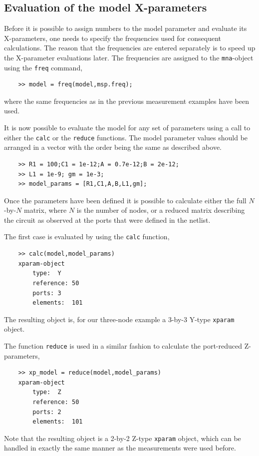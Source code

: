 \subsection{Evaluation of the model X-parameters}
Before it is possible to assign numbers to the model parameter and
evaluate its X-parameters, one needs to specify the frequencies
used for consequent calculations. The reason that the frequencies
are entered separately is to speed up the X-parameter evaluations
later. The frequencies are assigned to the \verb"mna"-object using
the \verb"freq" command,
\begin{small}
\begin{verbatim}
    >> model = freq(model,msp.freq);
\end{verbatim}
\end{small}
where the same frequencies as in the previous measurement examples
have been used.

It is now possible to evaluate the model for any set of parameters
using a call to either the \verb"calc" or the \verb"reduce"
functions. The model parameter values should be arranged in a
vector with the order being the same as described above.
\begin{small}
\begin{verbatim}
    >> R1 = 100;C1 = 1e-12;A = 0.7e-12;B = 2e-12;
    >> L1 = 1e-9; gm = 1e-3;
    >> model_params = [R1,C1,A,B,L1,gm];
\end{verbatim}
\end{small}

Once the parameters have been defined it is possible to calculate
either the full $N$-by-$N$ matrix, where $N$ is the number of
nodes, or a reduced matrix describing the circuit as observed at
the ports that were defined in the netlist.

The first case is evaluated by using the \verb"calc" function,
\begin{small}
\begin{verbatim}
    >> calc(model,model_params)
    xparam-object
        type:  Y
        reference: 50
        ports: 3
        elements:  101
\end{verbatim}
\end{small}
The resulting object is, for our three-node example a 3-by-3
Y-type \verb"xparam" object.

The function \verb"reduce" is used in a similar fashion to
calculate the port-reduced Z-parameters,
\begin{small}
\begin{verbatim}
    >> xp_model = reduce(model,model_params)
    xparam-object
        type:  Z
        reference: 50
        ports: 2
        elements:  101
\end{verbatim}
\end{small}
Note that the resulting object is a 2-by-2 Z-type \verb"xparam"
object, which can be handled in exactly the same manner as the
measurements were used before.
